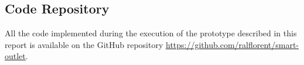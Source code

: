 %
%
%
%


\clearpage
\appendix
\begin{appendices}
    \section{Code Repository}
    \label{sec:code-repo}

    All the code implemented during the execution of the prototype described in this report is available on the GitHub repository \href{https://github.com/ralflorent/smart-outlet}{https://github.com/ralflorent/smart-outlet}.

\end{appendices}
